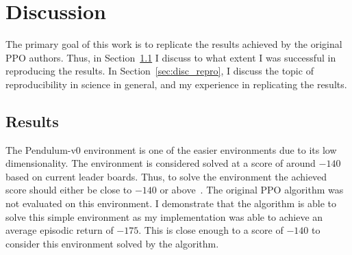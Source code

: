 \chapter{Discussion}\label{ch:discussion}
The primary goal of this work is to replicate the results achieved by the original PPO authors.
Thus, in Section~\ref{sec:disc_results} I discuss to what extent I was successful in reproducing the results.
In Section~\ref{sec:disc_repro}, I discuss the topic of reproducibility in science in general, and my experience in replicating the results.


\section{Results}\label{sec:disc_results}
The Pendulum-v0 environment is one of the easier environments due to its low dimensionality.
The environment is considered solved at a score of around $-140$ based on current leader boards.
Thus, to solve the environment the achieved score should either be close to $-140$ or above~\cite{Oller2020}.
The original PPO algorithm was not evaluated on this environment.
I demonstrate that the algorithm is able to solve this simple environment as my implementation was able to achieve
an average episodic return of $-175$.
This is close enough to a score of $-140$ to consider this environment solved by the algorithm.

